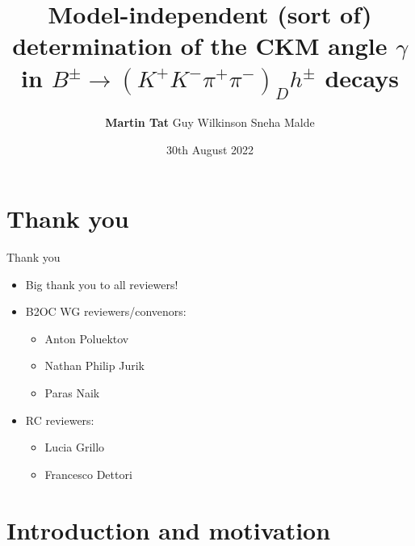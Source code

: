 \documentclass{beamer}
\title[$B^\pm\to(K^+K^-\pi^+\pi^-)_Dh^\pm$]{Model-independent (sort of) determination of the CKM angle \texorpdfstring{$\gamma$}{gamma} in \texorpdfstring{$B^\pm\to(K^+K^-\pi^+\pi^-)_Dh^\pm$}{B to K+K-pi+pi-} decays}
\author{\textbf{Martin Tat} \hspace{0.54em} Guy Wilkinson \hspace{0.54em} Sneha Malde}
\institute{\normalsize University of Oxford \\ \vspace{0.3cm} \normalsize Approval presentation \vspace{-0.2cm}}
\date{30th August 2022}
\begin{document}
\begin{frame}
  \titlepage
\end{frame}


\section{Thank you}

\begin{frame}{Thank you}
  \begin{itemize}
    \item{Big thank you to all reviewers!}
    \item{B2OC WG reviewers/convenors:}
    \begin{itemize}
      \item{Anton Poluektov}
      \item{Nathan Philip Jurik}
      \item{Paras Naik}
    \end{itemize}
    \item{RC reviewers:}
    \begin{itemize}
      \item{Lucia Grillo}
      \item{Francesco Dettori}
    \end{itemize}
  \end{itemize}
\end{frame}

\section{Introduction and motivation}
\end{document}
